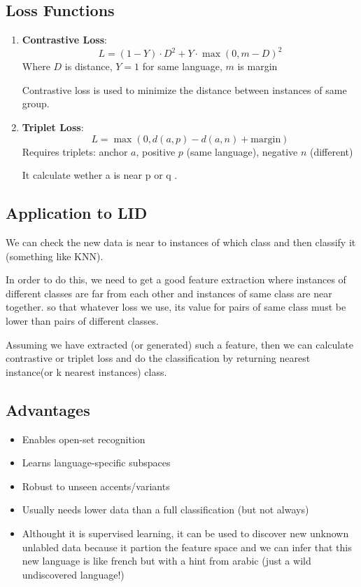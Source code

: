 \documentclass[12pt,a4paper]{article}
\begin{document}
	\subsection{Loss Functions \cite{triplet_lossf}}
	\begin{enumerate}
		\item \textbf{Contrastive Loss}:
		\[
		L = (1-Y) \cdot D^2 + Y \cdot \max(0, m-D)^2
		\]
		Where $D$ is distance, $Y=1$ for same language, $m$ is margin
		
		Contrastive loss is used to minimize the distance between instances of same group.
		
		\item \textbf{Triplet Loss}:
		\[
		L = \max(0, d(a, p) - d(a, n) + \text{margin})
		\]
		Requires triplets: anchor $a$, positive $p$ (same language), negative $n$ (different)
		
		It calculate wether a is near p or q . 
	\end{enumerate}
	
	\subsection{Application to LID}
We can check the new data is near to instances of which class and then classify it (something like KNN). 

In order to do this, we need to get a good feature extraction where instances of different classes are far from each other and instances of same class are near together. so that whatever loss we use, its value for pairs of same class must be lower than pairs of different classes.

Assuming we have extracted (or generated) such a feature, then we can calculate contrastive or triplet loss and do the classification by returning nearest instance(or k nearest instances) class. 
	
	\subsection{Advantages}
	\begin{itemize}
		\item Enables open-set recognition
		\item Learns language-specific subspaces
		\item Robust to unseen accents/variants
		\item Usually needs lower data than a full classification (but not always)
		\item Althought it is supervised learning, it can be used to discover new unknown unlabled data because it partion the feature space and we can infer that this new language is like french but with a hint from arabic (just a wild undiscovered language!)
	\end{itemize}
	
\end{document}
